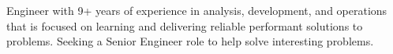 
\begin {cvparagraph}

 Engineer with 9+ years of experience in analysis, development, and operations
 that is focused on learning and delivering reliable performant solutions to
 problems. Seeking a Senior Engineer role to help solve interesting problems.

\end{cvparagraph}
